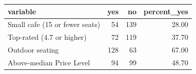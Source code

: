 \begin{tabular}{lrrr}
  \toprule
variable & yes & no & percent\_yes \\ 
  \midrule
Small cafe (15 or fewer seats) &  54 & 139 & 28.00 \\ 
  Top-rated (4.7 or higher) &  72 & 119 & 37.70 \\ 
  Outdoor seating & 128 &  63 & 67.00 \\ 
  Above-median Price Level &  94 &  99 & 48.70 \\ 
   \bottomrule
\end{tabular}
